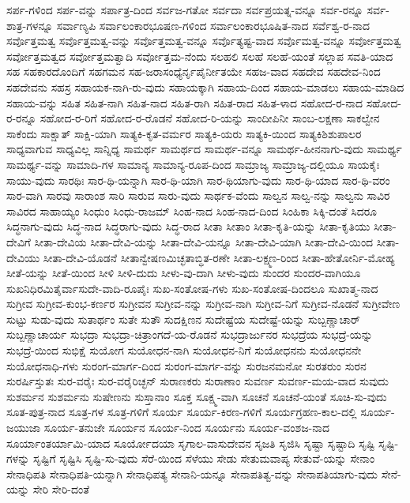 {ಸರ್ಪ-ಗಳಿಂದ
ಸರ್ಪ-ವನ್ನು
ಸರ್ಪಾತ್ರ-ದಿಂದ
ಸರ್ವಜ-ಗತೋ
ಸರ್ವದಾ
ಸರ್ವಪ್ರಯತ್ನ-ವನ್ನೂ
ಸರ್ವ-ರನ್ನೂ
ಸರ್ವ-ಶಾತ್ರ-ಗಳನ್ನೂ
ಸರ್ವಾಣ್ಯಪಿ
ಸರ್ವಾಲಂಕಾರಭೂಷಣ-ಗಳಿಂದ
ಸರ್ವಾಲಂಕಾರಭೂಷಿತ-ನಾದ
ಸರ್ವೆಶ್ವ-ರ-ನಾದ
ಸರ್ವೊತ್ತಮತ್ವ
ಸರ್ವೊತ್ತಮತ್ವ-ವನ್ನು
ಸರ್ವೊತ್ತಮತ್ವ-ವನ್ನೂ
ಸರ್ವೊತ್ಯಷ್ಟ-ವಾದ
ಸರ್ವೊಮತ್ವ-ವನ್ನೂ
ಸರ್ವೋತ್ತಮತ್ವ
ಸರ್ವೋತ್ತಮತ್ವದ
ಸರ್ವೋತ್ತಮತ್ವಾದಿ
ಸರ್ವೋತ್ತಮ-ನೆಂದು
ಸಲಹಲಿ
ಸಲಹೆ
ಸಲಹೆ-ಯಂತೆ
ಸಲ್ಲಾಪ
ಸವತಿ-ಯಾದ
ಸಹ
ಸಹಕಾರದೊಂದಿಗೆ
ಸಹಗಮನ
ಸಹ-ಜರಾಸಂಧ್ಯೆರ್ನೃಪೈರ್ನೀತಯೇ
ಸಹಜ-ವಾದ
ಸಹದೇವ
ಸಹದೇವ-ನಿಂದ
ಸಹದೇವನು
ಸಹಸ್ರ
ಸಹಾಯಕ-ನಾಗಿ-ರು-ವುದು
ಸಹಾಯಕ್ಕಾಗಿ
ಸಹಾಯ-ದಿಂದ
ಸಹಾಯ-ಮಾಡಲು
ಸಹಾಯ-ಮಾಡಿದ
ಸಹಾಯ-ವನ್ನು
ಸಹಿತ
ಸಹಿತ-ನಾಗಿ
ಸಹಿತ-ನಾದ
ಸಹಿತ-ರಾಗಿ
ಸಹಿತ-ರಾದ
ಸಹಿತ-ಳಾದ
ಸಹೋದ-ರ-ನಾದ
ಸಹೋದ-ರ-ರನ್ನೂ
ಸಹೋದ-ರ-ರಿಗೆ
ಸಹೋದ-ರ-ರೊಡನೆ
ಸಹೋದ-ರಿ-ಯನ್ನು
ಸಾಂದೀಪಿನೀ
ಸಾಂಬ-ಲಕ್ಷಣಾ
ಸಾಕಲ್ವೇನ
ಸಾಕೆಂದು
ಸಾಕ್ಷಾತ್
ಸಾಕ್ಷಿ-ಯಾಗಿ
ಸಾತ್ಯಕಿ-ಕೃತ-ವರ್ಮರ
ಸಾತ್ಯಕಿ-ಯರು
ಸಾತ್ಯಕಿ-ಯಿಂದ
ಸಾತ್ಯಕಿಶಿಶುಪಾಲರ
ಸಾಧ್ಯವಾಗುವ
ಸಾಧ್ಯವಿಲ್ಲ
ಸಾನ್ನಿಧ್ಯ
ಸಾಮರ್ಥ
ಸಾಮರ್ಥದ
ಸಾಮರ್ಥ-ವನ್ನೂ
ಸಾಮರ್ಥ-ಹೀನನಾಗು-ವುದು
ಸಾಮರ್ಥ್ಯ
ಸಾಮರ್ಥ್ಯ-ವನ್ನು
ಸಾಮಾದಿ-ಗಳ
ಸಾಮಾನ್ಯ
ಸಾಮಾನ್ಯ-ರೂಪ-ದಿಂದ
ಸಾಮ್ರಾಜ್ಯ
ಸಾಮ್ರಾಜ್ಯ-ದಲ್ಲಿಯೂ
ಸಾಯಕೈಃ
ಸಾಯು-ವುದು
ಸಾರಥಿಃ
ಸಾರ-ಥಿ-ಯನ್ನಾಗಿ
ಸಾರ-ಥಿ-ಯಾಗಿ
ಸಾರ-ಥಿಯಾಗು-ವುದು
ಸಾರ-ಥಿ-ಯಾದ
ಸಾರ-ಥಿ-ವರಂ
ಸಾರ-ವಾಗಿ
ಸಾರವು
ಸಾರಾಂಶ
ಸಾರಿ
ಸಾರುವ
ಸಾರು-ವುದು
ಸಾರ್ಥಕ-ವೆಂದು
ಸಾಲ್ವನ
ಸಾಲ್ವ-ನನ್ನು
ಸಾಲ್ವನು
ಸಾವಿರ
ಸಾವಿರದ
ಸಾಹಾಯ್ಯಂ
ಸಿಂಧುಂ
ಸಿಂಧು-ರಾಜಮ್
ಸಿಂಹ-ನಾದ
ಸಿಂಹ-ನಾದ-ದಿಂದ
ಸಿಂಹಿಕಾ
ಸಿಕ್ಕಿ-ದಂತೆ
ಸಿದರೂ
ಸಿದ್ಧನಾಗು-ವುದು
ಸಿದ್ಧ-ನಾದ
ಸಿದ್ಧರಾಗು-ವುದು
ಸಿದ್ಧ-ರಾದ
ಸೀತಾ
ಸೀತಾಂ
ಸೀತಾ-ಕೃತಿ-ಯನ್ನು
ಸೀತಾ-ಕೃತಿಯು
ಸೀತಾ-ದೇವಿಗೆ
ಸೀತಾ-ದೇವಿಯ
ಸೀತಾ-ದೇವಿ-ಯನ್ನು
ಸೀತಾ-ದೇವಿ-ಯನ್ನೂ
ಸೀತಾ-ದೇವಿ-ಯಾಗಿ
ಸೀತಾ-ದೇವಿ-ಯಿಂದ
ಸೀತಾ-ದೇವಿಯು
ಸೀತಾ-ದೇವಿ-ಯೊಡನೆ
ಸೀತಾನ್ವೇಷಣಮಿಚ್ಛತಾಬ್ಧಿತ-ರಣೇ
ಸೀತಾ-ಲಕ್ಷ್ಮಣ-ರಿಂದ
ಸೀತಾ-ಹೇತೋರ್ನಿ-ಮೋಹ್ಯ
ಸೀತೆ-ಯನ್ನು
ಸೀತೆ-ಯಿಂದ
ಸೀಳಿ
ಸೀಳಿ-ದುದು
ಸೀಳು-ವು-ದಾಗಿ
ಸೀಳು-ವುದು
ಸುಂದರ
ಸುಂದರ-ವಾಗಿಯೂ
ಸುಖನಿಧಿರಮಿತೈರ್ವಾಸುದೇ-ವಾದಿ-ರೂಪೈಃ
ಸುಖ-ಸಂತೋಷ-ಗಳು
ಸುಖ-ಸಂತೋಷ-ದಿಂದಲೂ
ಸುಖಾತ್ಮ-ನಾದ
ಸುಗ್ರೀವ
ಸುಗ್ರೀವ-ಕುಂಭ-ಕರ್ಣರ
ಸುಗ್ರೀವನ
ಸುಗ್ರೀವ-ನನ್ನು
ಸುಗ್ರೀವ-ನಾಗಿ
ಸುಗ್ರೀವ-ನಿಗೆ
ಸುಗ್ರೀವ-ನೊಡನೆ
ಸುಗ್ರೀವೇಣ
ಸುಟ್ಟು
ಸುಡು-ವುದು
ಸುತಾರ್ಥಂ
ಸುತೇ
ಸುತೌ
ಸುದಕ್ಷಿಣನ
ಸುದೇಷ್ಟೆಯ
ಸುದೇಷ್ಟೆ-ಯನ್ನು
ಸುಬ್ಬಣ್ಣಾಚಾರ್
ಸುಬ್ಬಣ್ಣಾಚಾರ್ಯ
ಸುಭದ್ರಾ
ಸುಭದ್ರಾ-ಚಿತ್ರಾಂಗದೆ-ಯ-ರೊಡನೆ
ಸುಭದ್ರಾರ್ಜುನರ
ಸುಭದ್ರೆಯ
ಸುಭದ್ರೆ-ಯನ್ನು
ಸುಭದ್ರೆ-ಯಿಂದ
ಸುಭಿಕ್ಷೆ
ಸುಯೋಗ
ಸುಯೋಧನ-ನಾಗಿ
ಸುಯೋಧನ-ನಿಗೆ
ಸುಯೋಧನನು
ಸುಯೋಧನನೇ
ಸುಯೋಧನಾಧಿ-ಗಳು
ಸುರಂಗ-ಮಾರ್ಗ-ದಿಂದ
ಸುರಂಗ-ಮಾರ್ಗ-ವನ್ನು
ಸುರಜನಮನೋ
ಸುರತರುಂ
ಸುರನ
ಸುರರ್ಷಿಸ್ತುತಃ
ಸುರ-ವರೈಃ
ಸುರ-ವರೈರಿಚ್ಛನ್
ಸುರಾಣಕರು
ಸುರಾಣಾಂ
ಸುವರ್ಣ
ಸುವರ್ಣ-ಮಯ-ವಾದ
ಸುವುದು
ಸುಶರ್ಮನ
ಸುಶರ್ಮನು
ಸುಷೇಣನು
ಸುಸ್ತಾನಾಂ
ಸೂಕ್ತ
ಸೂಕ್ಷ್ಮ-ವಾಗಿ
ಸೂಚನೆ
ಸೂಚನೆ-ಯಂತೆ
ಸೂಚಿ-ಸು-ವುದು
ಸೂತ-ಪುತ್ರ-ನಾದ
ಸೂತ್ರ-ಗಳ
ಸೂತ್ರ-ಗಳಿಗೆ
ಸೂರ್ಯ
ಸೂರ್ಯ-ಕಿರಣ-ಗಳಿಗೆ
ಸೂರ್ಯಗ್ರಹಣ-ಕಾಲ-ದಲ್ಲಿ
ಸೂರ್ಯ-ಜಯುಜಾ
ಸೂರ್ಯ-ತನುಜೇ
ಸೂರ್ಯನ
ಸೂರ್ಯ-ನಿಂದ
ಸೂರ್ಯನು
ಸೂರ್ಯ-ವಂಶಜ-ನಾದ
ಸೂರ್ಯಾಂತರ್ಯಾಮಿ-ಯಾದ
ಸೂರ್ಯೋದಯಾ
ಸೃಗಾಲ-ವಾಸುದೇವನ
ಸೃಜತಿ
ಸೃಜಿಸಿ
ಸೃಷ್ಟಾ
ಸೃಷ್ಟಾದಿ
ಸೃಷ್ಟಿ
ಸೃಷ್ಟಿ-ಗಳನ್ನು
ಸೃಷ್ಟಿಗೆ
ಸೃಷ್ಟಿಸಿ
ಸೃಷ್ಟಿ-ಸು-ವುದು
ಸೆರೆ-ಯಿಂದ
ಸೆಳೆಯು
ಸೇಡು
ಸೇತುಮವಾಪ್ಯ
ಸೇತುವೆ-ಯನ್ನು
ಸೇನಾಂ
ಸೇನಾಧಿಪತಿ
ಸೇನಾಧಿಪತಿ-ಯನ್ನಾಗಿ
ಸೇನಾಧಿಪತ್ಯ
ಸೇನಾನಿ-ಯನ್ನೂ
ಸೇನಾಪತಿತ್ವ-ವನ್ನು
ಸೇನಾಪತಿಯಾಗು-ವುದು
ಸೇನೆ-ಯನ್ನು
ಸೇರಿ
ಸೇರಿ-ದಂತೆ
}
